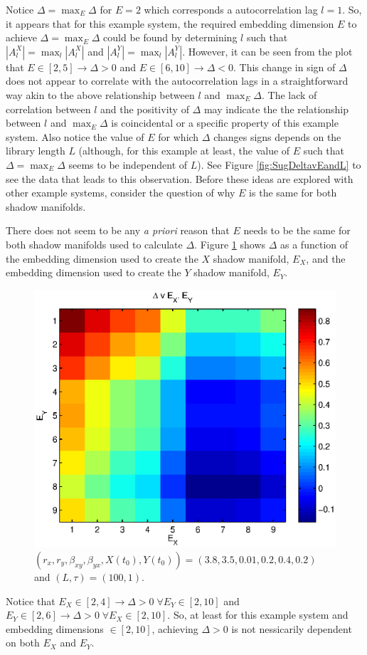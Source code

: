 \documentclass[a4paper,11pt]{article}
\begin{document}
Notice $\Delta = \max_E \Delta$ for $E=2$ which corresponds a autocorrelation lag $l=1$.  So, it appears that for this example system, the required embedding dimension $E$ to achieve $\Delta=\max_E \Delta$ could be found by determining $l$ such that $|A_l^X|=\max_l |A_l^X|$ and $|A_l^Y|=\max_l |A_l^Y|$.  However, it can be seen from the plot that $E\in [2,5]\rightarrow \Delta>0$ and $E\in [6,10]\rightarrow \Delta<0$.  This change in sign of $\Delta$ does not appear to correlate with the autocorrelation lags in a straightforward way akin to the above relationship between $l$ and $\max_E \Delta$.  The lack of correlation between $l$ and the positivity of $\Delta$ may indicate the the relationship between $l$ and $\max_E \Delta$ is coincidental or a specific property of this example system.  Also notice the value of $E$ for which $\Delta$ changes signs depends on the library length $L$ (although, for this example at least, the value of $E$ such that $\Delta = \max_E \Delta$ seems to be independent of $L$).  See Figure \ref{fig:SugDeltavEandL} to see the data that leads to this observation.  Before these ideas are explored with other example systems, consider the question of why $E$ is the same for both shadow manifolds.

There does not seem to be any {\em a priori} reason that $E$ needs to be the same for both shadow manifolds used to calculate $\Delta$.  Figure \ref{fig:SugExVaryE} shows $\Delta$ as a function of the embedding dimension used to create the $X$ shadow manifold, $E_X$, and the embedding dimension used to create the $Y$ shadow manifold, $E_Y$.  
\begin{figure}[h!t]
\centering
\label{fig:SugExVaryE}
\includegraphics[scale=0.55]{SugExVaryE.eps}
\caption{$\left(r_x,r_y,\beta_{xy},\beta_{yx},X(t_0),Y(t_0)\right) = \left(3.8,3.5,0.01,0.2,0.4,0.2\right)$ and $\left(L,\tau\right) = \left(100,1\right)$.}
\end{figure}
Notice that $E_X \in [2,4]\rightarrow \Delta>0\;\forall E_Y\in[2,10]$ and $E_Y \in[2,6]\rightarrow \Delta>0\;\forall E_X\in[2,10]$.  So, at least for this example system and embedding dimensions $\in[2,10]$, achieving $\Delta>0$ is not nessicarily dependent on both $E_X$ and $E_Y$.  
\end{document}
